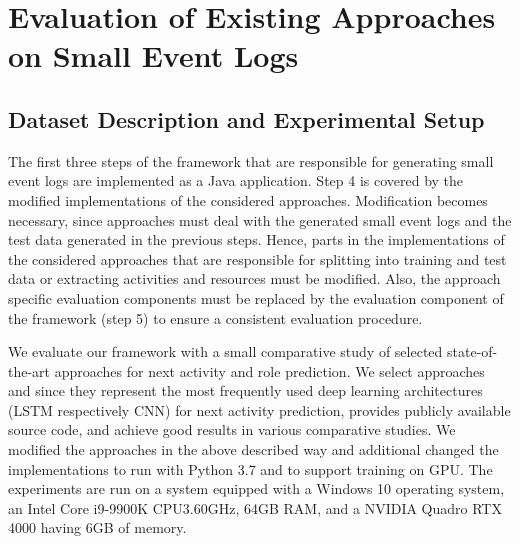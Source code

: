 \documentclass[runningheads]{llncs}
\begin{document}
\section{Evaluation of Existing Approaches on Small Event Logs}\label{Sec:Evaluation-of-Existing-Approaches-On-Small-Event-Logs}
\vspace{-5pt}
\subsection{Dataset Description and Experimental Setup}
\vspace{-5pt}
The first three steps of the framework that are responsible for generating small event logs are implemented as a Java application. Step 4 is covered by the modified implementations of the considered approaches. Modification becomes necessary, since approaches must deal with the generated small event logs and the test data generated in the previous steps. Hence, parts in the implementations of the considered approaches that are responsible for splitting into training and test data or extracting activities and resources must be modified. Also, the approach specific evaluation components must be replaced by the evaluation component of the framework (step 5) to ensure a consistent evaluation procedure.

We evaluate our framework with a small comparative study of selected state-of-the-art approaches for next activity and role prediction. We select approaches \cite{camargo_lstm_2019} and \cite{Pasquadibisceglie} since they represent the most frequently used deep learning architectures (LSTM respectively CNN) for next activity prediction, provides publicly available source code, and achieve good results in various comparative studies. We modified the approaches in the above described way and additional changed the implementations to run with Python 3.7 and to support training on GPU. The experiments are run on a system equipped with a Windows 10 operating system, an Intel Core i9-9900K CPU3.60GHz, 64GB RAM, and a NVIDIA Quadro RTX 4000 having 6GB of memory.
\end{document}

